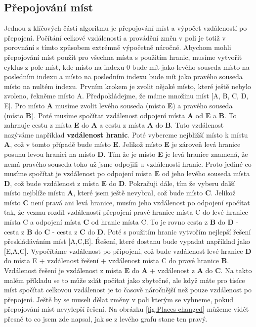 \subsection{Přepojování míst}\label{sec:places changes}
Jednou z klíčových částí algoritmu je přepojování míst a výpočet vzdáleností po přepojení. Počítání celkové vzdálenosti a provádění změn v poli je totiž v porovnání s tímto způsobem extrémně výpočetně náročné. Abychom mohli přepojování míst použít pro všechna místa s použitím hranic, musíme vytvořit cyklus z pole míst, kde místo na indexu 0 bude mít jako levého souseda místo na posledním indexu a místo na posledním indexu bude mít jako pravého souseda místo na nultém indexu. Prvním krokem je zvolit nějaké místo, které ještě nebylo zvoleno, řekněme místo A. Předpokládejme, že máme množinu míst [A, B, C, D, E]. Pro místo \textbf{A} musíme zvolit levého souseda (místo \textbf{E}) a pravého souseda (místo \textbf{B}). Poté musíme spočítat vzdálenost odpojení místa \textbf{A} od \textbf{E} a \textbf{B}. To zahrnuje cestu z místa \textbf{E} do \textbf{A} a cestu z místa \textbf{A} do \textbf{B}. Tuto vzdálenost nazýváme například \textbf{vzdálenost hranic}. Poté vybereme nejbližší místo k místu \textbf{A}, což v tomto případě bude místo \textbf{E}.
Jelikož místo \textbf{E} je zároveň levá hranice posunu levou hranici na místo \textbf{D}. Tím že je místo \textbf{E} je levá hranice znamená, že nemá pravého souseda toho už jsme odpojili u vzdálenosti hranic. Proto jediné co musíme spočítat je vzdálenost po odpojení místa \textbf{E} od jeho levého souseda místa \textbf{D}, což bude vzdálenost z místa \textbf{E} do \textbf{D}. Pokračuji dále, tím že vyberu další místo nejblíže místu \textbf{A}, které jsem ještě nevybral, což bude místo \textbf{C}. Jelikož místo \textbf{C} není pravá ani levá hranice, musím jeho vzdálenost po odpojení spočítat tak, že vezmu rozdíl vzdáleností přepojení pravé hranice místa C do levé hranice místa C a odpojení místa \textbf{C} od hranic místa C. To je rovno cesta z \textbf{B} do \textbf{D} - cesta z \textbf{B} do \textbf{C} - cesta z \textbf{C} do \textbf{D}.
Poté s použitím hranic vytvořím nejlepší řešení přeskládáváním míst [A,C,E]. Řešení, které dostanu bude vypadat například jako [E,A,C]. Vypočítáme vzdálenost po připojení, což bude vzdálenost levé hranice \textbf{D} do místa E + vzdálenost řešení + vzdálenost místa C do pravé hranice \textbf{B}. Vzdálenost řešení je vzdálenost z místa \textbf{E} do \textbf{A} + vzdálenost z \textbf{A} do \textbf{C}. Na takto malém příkladu se to může zdát počítat jako zbytečné, ale když máte pro tisíce míst spočítat celkovou vzdálenost je to časově náročnější než pouze vzdálenost po přepojení. Ještě by se museli dělat změny v poli kterým se vyhneme, pokud přepojování míst nevylepší řešení. Na obrázku \ref{fig:Places changed} můžeme vidět přesně to co jsem zde napsal, jak se z levého grafu stane ten pravý. 

